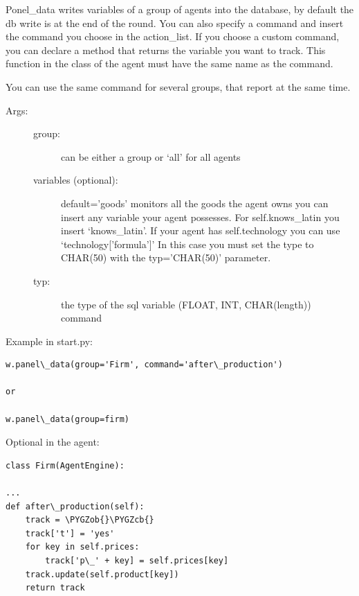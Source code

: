 \documentclass[letterpaper,10pt,english]{sphinxmanual}
\def\PYGZob{\char`\{}
\def\PYGZcb{\char`\}}
\begin{document}
\begin{fulllineitems}
\label{Database:abce.Simulation.panel_data}
Ponel\_data writes variables of a group of agents into the database, by default
the db write is at the end of the round. You can also specify a command
and insert the command you choose in the action\_list.
If you choose a custom command, you can declare a method that
returns the variable you want to track. This function in the class of the
agent must have the same name as the command.

You can use the same command for several groups, that report at the
same time.
\begin{description}
\item[{Args:}] \leavevmode\begin{description}
\item[{group:}] \leavevmode
can be either a group or `all' for all agents

\item[{variables (optional):}] \leavevmode
default='goods' monitors all the goods the agent owns
you can insert any variable your agent possesses. For
self.knows\_latin you insert `knows\_latin'. If your agent
has self.technology you can use `technology{[}'formula'{]}'
In this case you must set the type to CHAR(50) with the
typ='CHAR(50)' parameter.

\item[{typ:}] \leavevmode
the type of the sql variable (FLOAT, INT, CHAR(length))
command

\end{description}

\end{description}

Example in start.py:

\begin{Verbatim}[commandchars=\\\{\}]
w.panel\_data(group='Firm', command='after\_production')

or

w.panel\_data(group=firm)
\end{Verbatim}

Optional in the agent:

\begin{Verbatim}[commandchars=\\\{\}]
class Firm(AgentEngine):

...
def after\_production(self):
    track = \PYGZob{}\PYGZcb{}
    track['t'] = 'yes'
    for key in self.prices:
        track['p\_' + key] = self.prices[key]
    track.update(self.product[key])
    return track
\end{Verbatim}

\end{fulllineitems}
\end{document}
